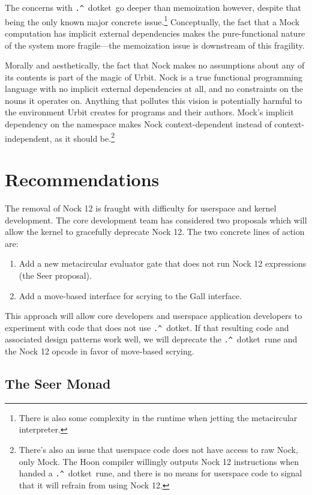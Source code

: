\documentclass[twoside]{article}
\newcommand{\dotket}{\texttt{\string.\string^}~dotket}
\begin{document}
The concerns with \dotket~go deeper than memoization however, despite that being the only known major concrete issue.\footnote{There is also some complexity in the runtime when jetting the metacircular interpreter.}  Conceptually, the fact that a Mock computation has implicit external dependencies makes the pure-functional nature of the system more fragile—the memoization issue is downstream of this fragility.

Morally and aesthetically, the fact that Nock makes no assumptions about any of its contents is part of the magic of Urbit.  Nock is a true functional programming language with no implicit external dependencies at all, and no constraints on the nouns it operates on.  Anything that pollutes this vision is potentially harmful to the environment Urbit creates for programs and their authors.  Mock's implicit dependency on the namespace makes Nock context-dependent instead of context-independent, as it should be.\footnote{There's also an issue that userspace code does not have access to raw Nock, only Mock.  The Hoon compiler willingly outputs Nock 12 instructions when handed a \dotket~rune, and there is no means for userspace code to signal that it will refrain from using Nock 12.}


\section{Recommendations}

The removal of Nock 12 is fraught with difficulty for userspace and kernel development.  The core development team has considered two proposals which will allow the kernel to gracefully deprecate Nock 12.  The two concrete lines of action are:

\begin{enumerate}
  \item  Add a new metacircular evaluator gate that does not run Nock 12 expressions (the Seer proposal).
  \item  Add a move-based interface for scrying to the Gall interface.
\end{enumerate}

This approach will allow core developers and userspace application developers to experiment with code that does not use \dotket.  If that resulting code and associated design patterns work well, we will deprecate the \dotket~rune and the Nock 12 opcode in favor of move-based scrying.

\subsection{The Seer Monad}
\end{document}
